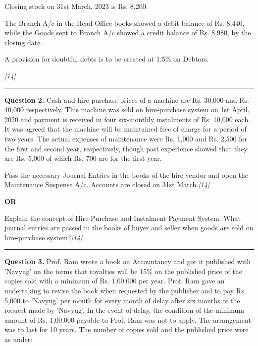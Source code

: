 \documentclass[11pt,a4paper]{article}
\newcommand{\pts}[1]{\hfill   \textit{[#1]}}
\begin{document}
\begin{parts}
  \item Closing stock on 31st March, 2023 is Rs. 8,200.
  \item The Branch A/c in the Head Office books showed a debit balance of Rs. 8,440, while the Goods sent to Branch A/c showed a credit balance of Rs. 8,980, by the closing date.
  \item A provision for doubtful debts is to be created at 1.5\% on Debtors.
\end{parts}\pts{14}

\medskip\rule{\linewidth}{0.2pt}

\pagebreak




\noindent   \textbf{Question 2.}
Cash and hire-purchase prices of a machine are Rs. 30,000 and Rs. 40,000 respectively. This machine was sold on hire-purchase system on 1st April, 2020 and payment is received in four six-monthly instalments of Rs. 10,000 each. It was agreed that the machine will be maintained free of charge for a period of two years. The actual expenses of maintenance were Rs. 1,000 and Rs. 2,500 for the first and second year, respectively, though past experience showed that they are Rs. 5,000 of which Rs. 700 are for the first year.

Pass the necessary Journal Entries in the books of the hire-vendor and open the Maintenance Suspense A/c. Accounts are closed on 31st March.\pts{14}

\centerline{   \textbf{OR}}

Explain the concept of Hire-Purchase and Instalment Payment System. What journal entries are passed in the books of buyer and seller when goods are sold on hire-purchase system?\pts{14}

\medskip\rule{\linewidth}{0.2pt}




\noindent   \textbf{Question 3.}
Prof. Ram wrote a book on Accountancy and got it published with 'Navyug' on the terms that royalties will be 15\% on the published price of the copies sold with a minimum of Rs. 1,00,000 per year. Prof. Ram gave an undertaking to revise the book when requested by the publisher and to pay Rs. 5,000 to 'Navyug' per month for every month of delay after six months of the request made by 'Navyug'. In the event of delay, the condition of the minimum amount of Rs. 1,00,000 payable to Prof. Ram was not to apply. The arrangement was to last for 10 years. The number of copies sold and the published price were as under:
\end{document}
